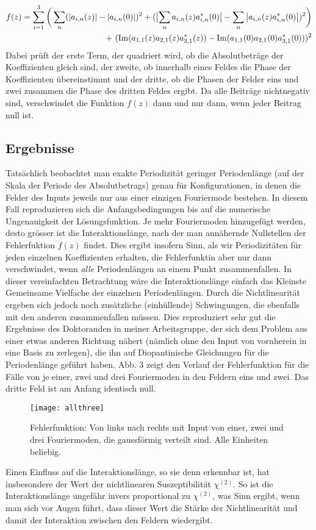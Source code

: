\documentclass{article}
\begin{document}
\begin{align}
\nonumber f(z)=\sum_{i=1}^{3}\bigg(\sum_{n} (\abs{a_{i, n}(z)} -\abs{a_{i, n}(0)})^2+(\bigl|\sum_n a_{i, n}(z) a_{i, n}^*(0) \bigr|-\sum_n\abs{ a_{i, n}(z) a_{i, n}^*(0)})^2\bigg) \\ +\ (\Im(a_{1,1}(z) a_{2,1}(z) a_{3,1}^*(z))-\Im(a_{1,1}(0) a_{2,1}(0) a_{3,1}^*(0)))^2
\end{align}
Dabei pr\"{u}ft der erste Term, der quadriert wird, ob die Absolutbetr\"{a}ge der Koeffizienten gleich sind, der zweite, ob innerhalb eines Feldes die Phase der Koeffizienten \"{u}bereinstimmt und der dritte, ob die Phasen der Felder eins und zwei zusammen die Phase des dritten Feldes ergibt. Da alle Beitr\"{a}ge nichtnegativ sind, verschwindet die Funktion $f(z)$ dann und nur dann, wenn jeder Beitrag null ist.

\subsection{Ergebnisse}
Tats\"{a}chlich beobachtet man exakte Periodizit\"{a}t geringer Periodenl\"{a}nge (auf der Skala der Periode des Absolutbetrags) genau f\"{u}r Konfigurationen, in denen die Felder des Inputs jeweils nur aus einer einzigen Fouriermode bestehen. In diesem Fall reproduzieren sich die Anfangsbedingungen bis auf die numerische Ungenauigkeit der L\"{o}sungsfunktion. Je mehr Fouriermoden hinzugef\"{u}gt werden, desto gr\"{o}sser ist die Interaktionsl\"{a}nge, nach der man ann\"{a}hernde Nullstellen der Fehlerfuktion $f(z)$ findet. Dies ergibt insofern Sinn, als wir Periodizit\"{a}ten f\"{u}r jeden einzelnen Koeffizienten erhalten, die Fehlerfunktin aber nur dann verschwindet, wenn \emph{alle} Periodenl\"{a}ngen an einem Punkt zusammenfallen. In dieser vereinfachten Betrachtung w\"{a}re die Interaktionsl\"{a}nge einfach das Kleinste Gemeinsame Vielfache der einzelnen Periodenl\"{a}ngen. Durch die Nichtlinearit\"{a}t ergeben sich jedoch noch zus\"{a}tzliche (einh\"{u}llende) Schwingungen, die ebenfalls mit den anderen zusammenfallen m\"{u}ssen. Dies reproduziert sehr gut die Ergebnisse des Doktoranden in meiner Arbeitsgruppe, der sich dem Problem aus einer etwas anderen Richtung n\"{a}hert (n\"{a}mlich ohne den Input von vornherein in eine Basis zu zerlegen), die ihn auf Diopantinische Gleichungen f\"{u}r die Periodenl\"{a}nge gef\"{u}hrt haben. Abb. 3 zeigt den Verlauf der Fehlerfunktion f\"{u}r die F\"{a}lle von je einer, zwei und drei Fouriermoden in den Feldern eins und zwei. Das dritte Feld ist am Anfang identisch null.
\begin{figure}[h]
\texttt{[image: allthree]}
\caption{Fehlerfunktion: Von links nach rechts mit Input von einer, zwei und drei Fouriermoden, die gaussf\"{o}rmig verteilt sind. Alle Einheiten beliebig.}
\end{figure}
Einen Einfluss auf die Interaktionsl\"{a}nge, so sie denn erkennbar ist, hat insbesondere der Wert der nichtlinearen Suszeptibilit\"{a}t $\chi^{(2)}$. So ist die Interaktionsl\"{a}nge ungef\"{a}hr invers proportional zu $\chi^{(2)}$, was Sinn ergibt, wenn man sich vor Augen f\"{u}hrt, dass dieser Wert die St\"{a}rke der Nichtlinearit\"{a}t und damit der Interaktion zwischen den Feldern wiedergibt. 
\end{document}
